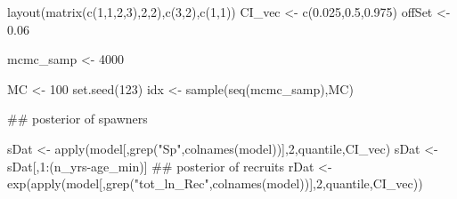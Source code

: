 \documentclass[
  11pt,
]{article}
\newenvironment{Shaded}{}{}
\newcommand{\CommentTok}[1]{\textcolor[rgb]{0.00,0.50,0.00}{#1}}
\newcommand{\DecValTok}[1]{#1}
\newcommand{\FloatTok}[1]{#1}
\newcommand{\KeywordTok}[1]{\textcolor[rgb]{0.00,0.00,1.00}{#1}}
\newcommand{\NormalTok}[1]{#1}
\newcommand{\OperatorTok}[1]{#1}
\newcommand{\StringTok}[1]{\textcolor[rgb]{0.00,0.50,0.50}{#1}}
\begin{document}
\begin{Shaded}
\begin{Highlighting}[]
\KeywordTok{layout}\NormalTok{(}\KeywordTok{matrix}\NormalTok{(}\KeywordTok{c}\NormalTok{(}\DecValTok{1}\NormalTok{,}\DecValTok{1}\NormalTok{,}\DecValTok{2}\NormalTok{,}\DecValTok{3}\NormalTok{),}\DecValTok{2}\NormalTok{,}\DecValTok{2}\NormalTok{),}\KeywordTok{c}\NormalTok{(}\DecValTok{3}\NormalTok{,}\DecValTok{2}\NormalTok{),}\KeywordTok{c}\NormalTok{(}\DecValTok{1}\NormalTok{,}\DecValTok{1}\NormalTok{))}
\NormalTok{CI_vec <-}\StringTok{ }\KeywordTok{c}\NormalTok{(}\FloatTok{0.025}\NormalTok{,}\FloatTok{0.5}\NormalTok{,}\FloatTok{0.975}\NormalTok{)}
\NormalTok{offSet <-}\StringTok{ }\FloatTok{0.06}

\NormalTok{mcmc_samp <-}\StringTok{ }\DecValTok{4000}

\NormalTok{MC <-}\StringTok{ }\DecValTok{100}
\KeywordTok{set.seed}\NormalTok{(}\DecValTok{123}\NormalTok{)}
\NormalTok{idx <-}\StringTok{ }\KeywordTok{sample}\NormalTok{(}\KeywordTok{seq}\NormalTok{(mcmc_samp),MC)}

\CommentTok{## posterior of spawners}

\NormalTok{sDat <-}\StringTok{ }\KeywordTok{apply}\NormalTok{(model[,}\KeywordTok{grep}\NormalTok{(}\StringTok{"Sp"}\NormalTok{,}\KeywordTok{colnames}\NormalTok{(model))],}\DecValTok{2}\NormalTok{,quantile,CI_vec)}
\NormalTok{sDat <-}\StringTok{ }\NormalTok{sDat[,}\DecValTok{1}\OperatorTok{:}\NormalTok{(n_yrs}\OperatorTok{-}\NormalTok{age_min)]}
\CommentTok{## posterior of recruits}
\NormalTok{rDat <-}\StringTok{ }\KeywordTok{exp}\NormalTok{(}\KeywordTok{apply}\NormalTok{(model[,}\KeywordTok{grep}\NormalTok{(}\StringTok{"tot_ln_Rec"}\NormalTok{,}\KeywordTok{colnames}\NormalTok{(model))],}\DecValTok{2}\NormalTok{,quantile,CI_vec))}



\end{Highlighting}
\end{Shaded}
\end{document}
